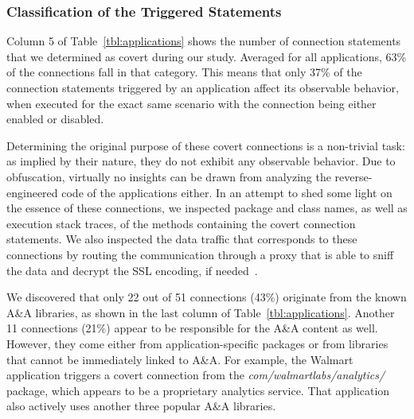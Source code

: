 \subsubsection{Classification of the Triggered Statements}
Column 5 of Table~\ref{tbl:applications} shows the number of connection statements that we determined as covert during our study. 
Averaged for all applications, 63\% of the connections fall in that category. 
This means that only 37\% of the connection statements triggered by an application affect its observable behavior, 
when executed for the exact same scenario with the connection being either enabled or disabled.




Determining the original purpose of these covert connections is a non-trivial task: 
as implied by their nature, they do not exhibit any observable behavior. 
Due to obfuscation, virtually no insights can be drawn from analyzing the reverse-engineered code of the applications either. 
In an attempt to shed some light on the essence of these connections, 
we inspected package and class names, 
as well as execution stack traces, of the methods containing the covert connection statements.
We also inspected the data traffic that corresponds to these connections by routing the communication through a proxy that is able to sniff the data and decrypt the SSL encoding, if needed~\cite{charles}. 

We discovered that only 22 out of 51 connections (43\%) originate from the known A\&A libraries, as shown in the last column of Table~\ref{tbl:applications}. 
Another 11 connections (21\%) appear to be responsible for the A\&A content as well. 
However, they come either from application-specific packages or from libraries that cannot be immediately linked to A\&A. 
For example, the Walmart application triggers a covert connection from the \emph{com/walmartlabs/analytics/} package, which appears to be a proprietary analytics service. %
That application also actively uses another three popular A\&A libraries. 

